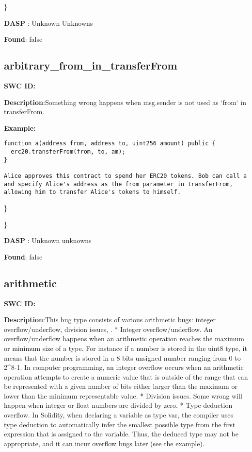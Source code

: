 \documentclass{article}
\begin{document}
\} 

\textbf{DASP} : Unknown Unknowns

\textbf{Found}: false

\subsection{arbitrary\_from\_in\_transferFrom} 
\textbf{SWC \textunderscore ID:} 

\textbf{Description}:Something wrong happens when msg.sender is not used as `from` in transferFrom.


\textbf{Example:} 
\begin{verbatim}
function a(address from, address to, uint256 amount) public {
  erc20.transferFrom(from, to, am);
}

Alice approves this contract to spend her ERC20 tokens. Bob can call a and specify Alice's address as the from parameter in transferFrom, allowing him to transfer Alice's tokens to himself.

\end{verbatim}\} 

\} 

\textbf{DASP} : Unknown unknowns

\textbf{Found}: false

\subsection{arithmetic} 
\textbf{SWC \textunderscore ID:} 

\textbf{Description}:This bug type consists of various arithmetic bugs: integer overflow/underflow, division issues, .
* Integer overflow/underflow. An overflow/underflow happens when an arithmetic operation reaches the maximum or minimum size of a type. For instance if a number is stored in the uint8 type, it means that the number is stored in a 8 bits unsigned number ranging from 0 to 2^8-1. In computer programming, an integer overflow occurs when an arithmetic operation attempts to create a numeric value that is outside of the range that can be represented with a given number of bits either larger than the maximum or lower than the minimum representable value.
* Division issues. Some wrong will happen when integer or float numbers are divided by zero.
* Type deduction overflow. In Solidity, when declaring a variable as type var, the compiler uses type deduction to automatically infer the smallest possible type from the first expression that is assigned to the variable. Thus, the deduced type may not be appropriate, and it can incur overflow bugs later (see the example).
\end{document}

